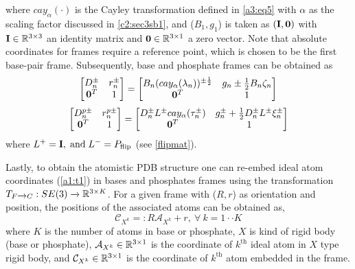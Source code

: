 where $cay_{\alpha}(\cdot)$ is the Cayley transformation defined in \cref{a3:eq5} with $\alpha$ as the scaling factor discussed in \cref{c2:sec3sb1}, and ($B_1,g_1$) is taken as $( \mathbf{I}, \mathbf{0} )$ with $\mathbf{I} \in {\mathbb R}^{3\times 3}$ an identity matrix and $\mathbf{0} \in {\mathbb R}^{3 \times 1}$ a zero vector.
Note that absolute coordinates for frames require a reference point, which is chosen to be the first base-pair frame.
Subsequently, base and phosphate frames can be obtained as
\begin{equation}
\begin{bmatrix}
D_n^{\pm} & r_n^{\pm} \\
\mathbf{0}^T & 1 
\end{bmatrix}
 = 
\begin{bmatrix}
 B_n (cay_{\alpha}(\lambda_n))^{\pm\frac{1}{2}} & g_n \pm \frac{1}{2} B_n\zeta_n \\
\mathbf{0}^T & 1 
\end{bmatrix}
\end{equation}
\begin{equation}
\begin{bmatrix}
D_n^{p\pm} & r_n^{p\pm} \\
\mathbf{0}^T & 1 
\end{bmatrix}
 =
\begin{bmatrix}
D_n^{\pm} L^\pm cay_{\alpha}(\tau_n^{\pm}) & g_n^{\pm} + \frac{1}{2} D_n^{\pm} L^\pm \xi_n^{\pm} \\
\mathbf{0}^T & 1
\end{bmatrix}
\end{equation}
where $L^+ = \mathbf{I}, {\;\text{and\;}} L^- =  
P_\text{{flip}}$ (see \cref{flipmat}).

Lastly, to obtain the atomistic PDB structure one can re-embed ideal atom coordinates (\cref{a1:t1}) in bases and phosphates frames using the transformation $T_{F\xrightarrow{}C}  :  SE(3)\xrightarrow{} {\mathbb R}^{3 \times K}$.
For a given frame with ($R,r$) as orientation and position, the positions of the associated atoms can be obtained as, 
\begin{equation}
\mathcal{C}_{X^k} =: R \mathcal{A}_{X^k} + r, \ \forall \ k = 1 \cdot \cdot K
\label{c2:eq_T_F_C}
\end{equation}
where $K$ is the number of atoms in base or phosphate, $X$ is kind of rigid body (base or phosphate), $\mathcal{A}_{X^k} \in {\mathbb R}^{3 \times 1}$
is the coordinate of $k^{\text{th}}$ ideal atom in $X$ type rigid body, and $\mathcal{C}_{X^k} \in {\mathbb R}^{3 \times 1}$ is the coordinate of $k^{\text{th}}$ atom embedded in the frame.



